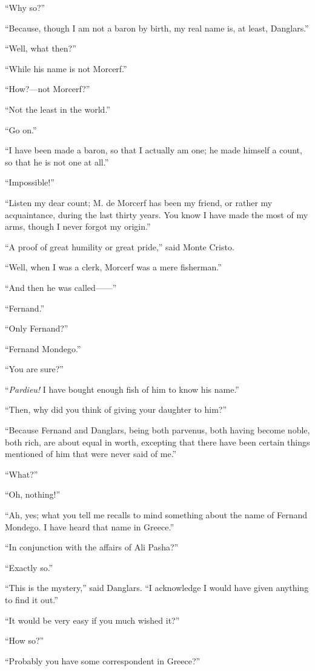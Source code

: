 “Why so?”

“Because, though I am not a baron by birth, my real name is, at least,
Danglars.”

“Well, what then?”

“While his name is not Morcerf.”

“How?—not Morcerf?”

“Not the least in the world.”

“Go on.”

“I have been made a baron, so that I actually am one; he made himself a
count, so that he is not one at all.”

“Impossible!”

“Listen my dear count; M. de Morcerf has been my friend, or rather my
acquaintance, during the last thirty years. You know I have made the
most of my arms, though I never forgot my origin.”

“A proof of great humility or great pride,” said Monte Cristo.

“Well, when I was a clerk, Morcerf was a mere fisherman.”

“And then he was called——”

“Fernand.”

“Only Fernand?”

“Fernand Mondego.”

“You are sure?”

“\textit{Pardieu!} I have bought enough fish of him to know his name.”

“Then, why did you think of giving your daughter to him?”

“Because Fernand and Danglars, being both parvenus, both having become
noble, both rich, are about equal in worth, excepting that there have
been certain things mentioned of him that were never said of me.”

“What?”

“Oh, nothing!”

“Ah, yes; what you tell me recalls to mind something about the name of
Fernand Mondego. I have heard that name in Greece.”

“In conjunction with the affairs of Ali Pasha?”

“Exactly so.”

“This is the mystery,” said Danglars. “I acknowledge I would have given
anything to find it out.”

“It would be very easy if you much wished it?”

“How so?”

“Probably you have some correspondent in Greece?”


